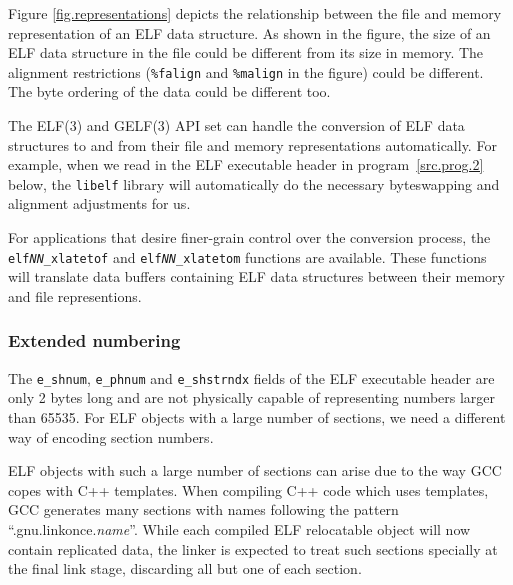 \documentclass[a4paper,pdftex]{book}
\newcommand{\function}[1]{\texttt{#1}}
\newcommand{\library}[1]{\texttt{#1}}
\newcommand{\parameter}[1]{\texttt{#1}}
\begin{document}
Figure \vref{fig.representations} depicts the relationship between the
file and memory representation of an ELF data structure.  As shown in
the figure, the size of an ELF data structure in the file could be
different from its size in memory.  The alignment restrictions
(\parameter{\%falign} and \parameter{\%malign} in the figure) could be
different.  The byte ordering of the data could be different too.%

The ELF(3) and GELF(3) API set can handle the conversion of ELF data
structures to and from their file and memory representations
automatically.  For example, when we read in the ELF executable header
in program~\vref{src.prog.2} below, the \library{libelf} library will
automatically do the necessary byteswapping and alignment adjustments
for us.%
%
%
\index{libelf@\library{libelf}!automatic data conversion}

For applications that desire finer-grain control over the conversion
process, the \function{elf\textit{NN}\_xlatetof} and
\function{elf\textit{NN}\_xlatetom} functions are available.  These
functions will translate data buffers containing ELF data structures
between their memory and file representions.%

\subsubsection{Extended numbering}\label{sec.extended-numbering}

%        
The \parameter{e\_shnum}, \parameter{e\_phnum} and
\parameter{e\_shstrndx} fields of the ELF executable header are only 2
bytes long and are not physically capable of representing numbers
larger than 65535.  For ELF objects with a large number of sections,
we need a different way of encoding section numbers.%

ELF objects with such a large number of sections can arise due to the
way GCC copes with C++ templates.  When compiling C++ code which uses
templates, GCC generates many sections with names following the
pattern ``.gnu.linkonce.\textit{name}''.  While each compiled ELF
relocatable object will now contain replicated data, the linker is
expected to treat such sections specially at the final link stage,
discarding all but one of each section.
\end{document}
